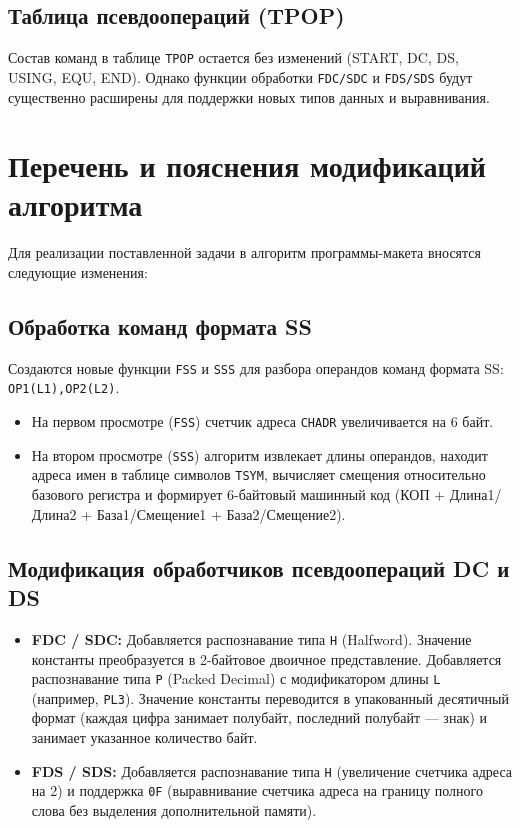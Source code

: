 \documentclass[12pt, a4paper]{article}
\begin{document}
\subsection{Таблица псевдоопераций (TPOP)}
Состав команд в таблице \texttt{TPOP} остается без изменений (START, DC, DS, USING, EQU, END). Однако функции обработки \texttt{FDC/SDC} и \texttt{FDS/SDS} будут существенно расширены для поддержки новых типов данных и выравнивания.

\section{Перечень и пояснения модификаций алгоритма}

Для реализации поставленной задачи в алгоритм программы-макета вносятся следующие изменения:

\subsection{Обработка команд формата SS}
Создаются новые функции \texttt{FSS} и \texttt{SSS} для разбора операндов команд формата SS: \texttt{OP1(L1),OP2(L2)}.
\begin{itemize}
    \item На первом просмотре (\texttt{FSS}) счетчик адреса \texttt{CHADR} увеличивается на 6 байт.
    \item На втором просмотре (\texttt{SSS}) алгоритм извлекает длины операндов, находит адреса имен в таблице символов \texttt{TSYM}, вычисляет смещения относительно базового регистра и формирует 6-байтовый машинный код (КОП + Длина1/Длина2 + База1/Смещение1 + База2/Смещение2).
\end{itemize}

\subsection{Модификация обработчиков псевдоопераций DC и DS}
\begin{itemize}
    \item \textbf{FDC / SDC:} Добавляется распознавание типа \texttt{H} (Halfword). Значение константы преобразуется в 2-байтовое двоичное представление. Добавляется распознавание типа \texttt{P} (Packed Decimal) с модификатором длины \texttt{L} (например, \texttt{PL3}). Значение константы переводится в упакованный десятичный формат (каждая цифра занимает полубайт, последний полубайт — знак) и занимает указанное количество байт.
    \item \textbf{FDS / SDS:} Добавляется распознавание типа \texttt{H} (увеличение счетчика адреса на 2) и поддержка \texttt{0F} (выравнивание счетчика адреса на границу полного слова без выделения дополнительной памяти).
\end{itemize}
\end{document}
